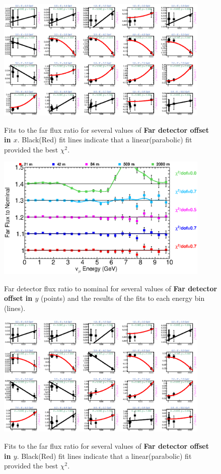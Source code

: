 \begin{figure}[hb]
  \begin{center}
    {\includegraphics[width=4.0in]{figures/LBNEFDX_far_fits.eps}}
  \end{center}
\caption{ Fits to the far flux ratio for several values of {\bf Far detector offset in $x$}. Black(Red) fit lines indicate that a linear(parabolic) fit provided the best $\chi^2$. }
\end{figure}

\begin{figure}[ht]
  \begin{center}
    {\includegraphics[width=4.0in]{figures/LBNEFDY_far_summary.eps}}
  \end{center}
\caption{ Far detector flux ratio to nominal for several values of {\bf Far detector offset in $y$} (points) and the results of the fits to each energy bin (lines).}
\end{figure}

\begin{figure}[hb]
  \begin{center}
    {\includegraphics[width=4.0in]{figures/LBNEFDY_far_fits.eps}}
  \end{center}
\caption{ Fits to the far flux ratio for several values of {\bf Far detector offset in $y$}. Black(Red) fit lines indicate that a linear(parabolic) fit provided the best $\chi^2$. }
\end{figure}

